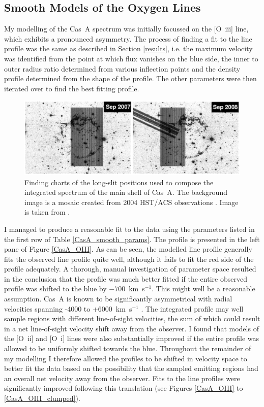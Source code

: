 \subsection{Smooth Models of the Oxygen Lines}
\label{scn:CasA_smooth}
My modelling of the Cas~A spectrum was initially focussed on the [O~{\sc iii}] line, which exhibits a pronounced asymmetry.  The process of finding a fit to the line profile was the same as described in Section \ref{results}, i.e. the maximum velocity was identified from the point at which flux vanishes on the blue side, the inner to outer radius ratio determined from various inflection points and the density profile determined from the shape of the profile.  The other parameters were then iterated over to find the best fitting profile.  

\begin{figure}
\centering
\includegraphics[clip=true,scale=0.3, trim=0 0 0 0]{chapters/chapter6/figs/CasA/slit_positions.png}
\caption{Finding charts of the long-slit positions used to compose the integrated spectrum of the main shell of Cas~A.  The background image is a mosaic created from 2004 HST/ACS observations \citep{Fesen2006a}.  Image is taken from \citet{Milisavljevic2013}.}
\label{CasA_slit_positions}
\end{figure}

I managed to produce a reasonable fit to the data using the parameters listed in the first row of Table \ref{CasA_smooth_params}.  The profile is presented in the left pane of Figure \ref{CasA_OIII}.  As can be seen,  the modelled line profile generally fits the observed line profile quite well, although it fails to fit the red side of the profile adequately.  A thorough, manual investigation of parameter space resulted in the conclusion that the profile was much better fitted if the entire observed profile was shifted to the blue by $-700$~km~s$^{-1}$.  This might well be a reasonable assumption.  Cas~A is known to be significantly asymmetrical \citep{Rest2011} with radial velocities spanning -4000 to +6000~km~s$^{-1}$ \citep{Milisavljevic2013}.  The integrated profile may well sample regions with different line-of-sight velocities, the sum of which could result in a net line-of-sight velocity shift away from the observer.   I found that models of the  [O~{\sc ii}] and [O~{\sc i}] lines were also substantially improved if the entire profile was allowed to be uniformly shifted towards the blue.  Throughout the remainder of my modelling I therefore allowed the profiles to be shifted in velocity space to better fit the data based on the possibility that the sampled emitting regions had an overall net velocity away from the observer.  Fits to the line profiles were significantly improved following this translation (see Figures \ref{CasA_OIII} to \ref{CasA_OIII_clumped}).

